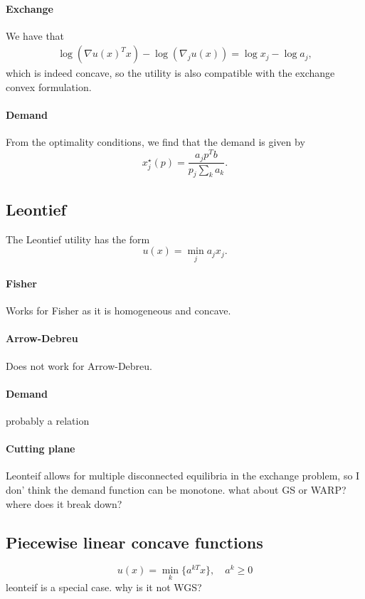 \documentclass[12pt]{article}
\begin{document}
\paragraph{Exchange}
We have that
\begin{align*}
\log(\nabla u(x)^T x) - \log(\nabla_j u(x)) =
\log x_j - \log a_j,
\end{align*}
which is indeed concave, so the utility is also compatible with
the exchange convex formulation.

\paragraph{Demand}
From the optimality conditions, we find that the demand is given by
\[
x^\star_j(p) = \frac{a_j p^Tb}{p_j\sum_k a_k}.
\]

\subsection{Leontief}
The Leontief utility has the form
\[
u(x) = \min_j a_j x_j.
\]

\paragraph{Fisher}
Works for Fisher as it is homogeneous and concave.

\paragraph{Arrow-Debreu}
Does not work for Arrow-Debreu.

\paragraph{Demand}
probably a relation

\paragraph{Cutting plane}
Leonteif allows for multiple disconnected equilibria in the exchange problem,
so I don' think the demand function can be monotone. what about
GS or WARP? where does it break down?

\subsection{Piecewise linear concave functions}
\[
u(x) = \min_k\lbrace a^{kT}x \rbrace,\quad a^k \geq 0
\]
leonteif is a special case. why is it not WGS?
\end{document}

